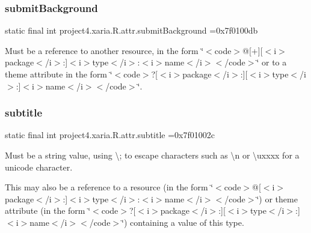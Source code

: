 \subsubsection{\texorpdfstring{submit\+Background}{submitBackground}}
{\footnotesize\ttfamily static final int project4.\+xaria.\+R.\+attr.\+submit\+Background =0x7f0100db\hspace{0.3cm}{\ttfamily [static]}}

Must be a reference to another resource, in the form \char`\"{}$<$code$>$@\mbox{[}+\mbox{]}\mbox{[}$<$i$>$package$<$/i$>$\+:\mbox{]}$<$i$>$type$<$/i$>$\+:$<$i$>$name$<$/i$>$$<$/code$>$\char`\"{} or to a theme attribute in the form \char`\"{}$<$code$>$?\mbox{[}$<$i$>$package$<$/i$>$\+:\mbox{]}\mbox{[}$<$i$>$type$<$/i$>$\+:\mbox{]}$<$i$>$name$<$/i$>$$<$/code$>$\char`\"{}. \mbox{\label{classproject4_1_1xaria_1_1R_1_1attr_a0529bd3b1311a5ee0ad81ea51a1913ad}} 
\subsubsection{\texorpdfstring{subtitle}{subtitle}}
{\footnotesize\ttfamily static final int project4.\+xaria.\+R.\+attr.\+subtitle =0x7f01002c\hspace{0.3cm}{\ttfamily [static]}}

Must be a string value, using \textquotesingle{}\textbackslash{};\textquotesingle{} to escape characters such as \textquotesingle{}\textbackslash{}n\textquotesingle{} or \textquotesingle{}\textbackslash{}uxxxx\textquotesingle{} for a unicode character. 

This may also be a reference to a resource (in the form \char`\"{}$<$code$>$@\mbox{[}$<$i$>$package$<$/i$>$\+:\mbox{]}$<$i$>$type$<$/i$>$\+:$<$i$>$name$<$/i$>$$<$/code$>$\char`\"{}) or theme attribute (in the form \char`\"{}$<$code$>$?\mbox{[}$<$i$>$package$<$/i$>$\+:\mbox{]}\mbox{[}$<$i$>$type$<$/i$>$\+:\mbox{]}$<$i$>$name$<$/i$>$$<$/code$>$\char`\"{}) containing a value of this type. \mbox{\label{classproject4_1_1xaria_1_1R_1_1attr_a6c8f5549820dff757872c167a8fd7bfd}} 
